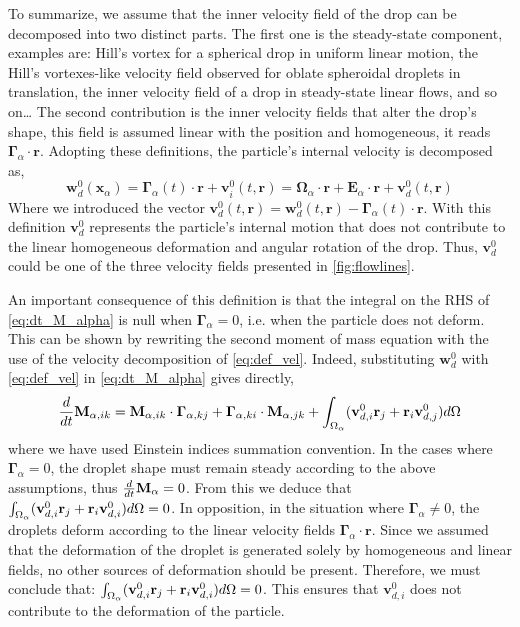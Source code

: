 To summarize, we assume that the inner velocity field of the drop can be decomposed into two distinct parts. 
The first one is the steady-state component, examples are: Hill's vortex for a spherical drop in uniform linear motion, the Hill's vortexes-like velocity field observed for oblate spheroidal droplets in translation,  the inner velocity field of a drop in steady-state linear flows, and so on\ldots 
The second contribution is the inner velocity fields that alter the drop's shape, this field is assumed linear with the position and homogeneous, it reads  $\bm\Gamma_\alpha\cdot \textbf{r}$. 
Adopting these definitions, the particle's internal velocity is decomposed as, 
\begin{equation}
    \textbf{w}_{d}^0(\textbf{x}_\alpha)
    = \bm\Gamma_{\alpha}(t) \cdot \textbf{r}
    + \textbf{v}^0_{i}(t,\textbf{r})
    =\bm{\Omega}_{\alpha}\cdot \textbf{r}
    + \textbf{E}_{\alpha} \cdot \textbf{r}
    + \textbf{v}^0_{d}(t,\textbf{r})
    \label{eq:def_vel}
\end{equation}
Where we introduced the vector $\textbf{v}^0_d(t,\textbf{r}) =\textbf{w}^{0}_{d}(t,\textbf{r})  - \bm\Gamma_{\alpha}(t) \cdot \textbf{r}$.
With this definition $\textbf{v}_d^0$ represents the particle's internal motion that does not contribute to the linear homogeneous deformation and angular rotation of the drop. 
Thus, $\textbf{v}_d^0$ could be one of the three velocity fields presented in \ref{fig:flowlines}. 

An important consequence of this definition is that the integral on the RHS of \ref{eq:dt_M_alpha} is null when $\bm\Gamma_\alpha = 0$, i.e. when the particle does not deform. 
This can be shown by rewriting the second moment of mass equation with the use of the velocity decomposition of \ref{eq:def_vel}.
Indeed, substituting $\textbf{w}_d^0$ with \ref{eq:def_vel} in \ref{eq:dt_M_alpha} gives directly,
\begin{equation*}
    \frac{d}{dt} \textbf{M}_{\alpha,ik}
    = 
    \textbf{M}_{\alpha,ik} \cdot \bm\Gamma_{\alpha,kj}
    +  \bm\Gamma_{\alpha,ki} \cdot \textbf{M}_{\alpha,jk}
    +
    \int_{\Omega_{\alpha}}  
        (\textbf{v}_{d,i}^0\textbf{r}_j
        + \textbf{r}_i\textbf{v}_{d,j}^0)
     d\Omega
\end{equation*}
where we have used Einstein indices summation convention. 
In the cases where $\bm\Gamma_\alpha = 0$, the droplet shape must remain steady according to the above assumptions, thus $\frac{d}{dt} \textbf{M}_\alpha = 0$.
From this we deduce that $\int_{\Omega_{\alpha}} (\textbf{v}^0_{d,i} \textbf{r}_j + \textbf{r}_i \textbf{v}_{d,i}^0) d\Omega = 0$. 
In opposition, in the situation where $\bm\Gamma_\alpha \neq 0$, the droplets deform according to the linear velocity fields $\bm\Gamma_\alpha \cdot \textbf{r}$.
Since we assumed that the deformation of the droplet is generated solely by homogeneous and linear fields, no other sources of deformation should be present. 
Therefore, we must conclude that: $\int_{\Omega_{\alpha}} (\textbf{v}^0_{d,i} \textbf{r}_j + \textbf{r}_i \textbf{v}_{d,i}^0) d\Omega = 0$.
This ensures that $\textbf{v}^0_{d,i} $ does not contribute to the deformation of the particle.

